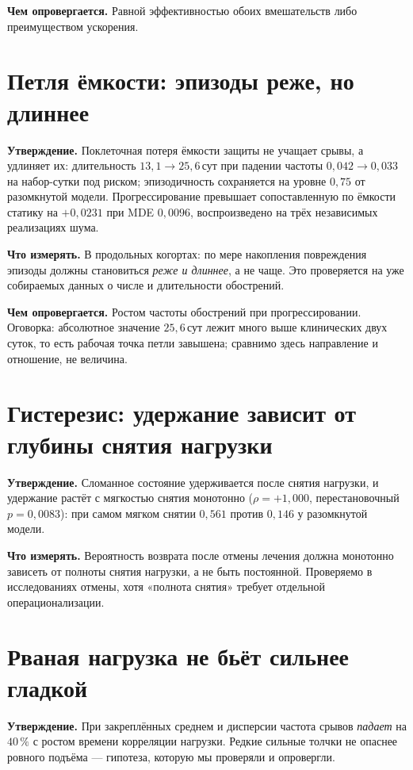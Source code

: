 \documentclass[11pt,a4paper]{article}
\begin{document}
\textbf{Чем опровергается.} Равной эффективностью обоих вмешательств либо преимуществом ускорения.

\section{Петля ёмкости: эпизоды реже, но длиннее}
\textbf{Утверждение.} Поклеточная потеря ёмкости защиты не учащает срывы, а удлиняет их:
длительность $13{,}1\to25{,}6$\,сут при падении частоты $0{,}042\to0{,}033$ на набор-сутки под
риском; эпизодичность сохраняется на уровне $0{,}75$ от разомкнутой модели. Прогрессирование
превышает сопоставленную по ёмкости статику на $+0{,}0231$ при MDE $0{,}0096$, воспроизведено на
трёх независимых реализациях шума.

\textbf{Что измерять.} В продольных когортах: по мере накопления повреждения эпизоды должны
становиться \emph{реже и длиннее}, а не чаще. Это проверяется на уже собираемых данных о числе и
длительности обострений.

\textbf{Чем опровергается.} Ростом частоты обострений при прогрессировании. Оговорка: абсолютное
значение $25{,}6$\,сут лежит много выше клинических двух суток, то есть рабочая точка петли
завышена; сравнимо здесь направление и отношение, не величина.

\section{Гистерезис: удержание зависит от глубины снятия нагрузки}
\textbf{Утверждение.} Сломанное состояние удерживается после снятия нагрузки, и удержание растёт
с мягкостью снятия монотонно ($\rho=+1{,}000$, перестановочный $p=0{,}0083$): при самом мягком
снятии $0{,}561$ против $0{,}146$ у разомкнутой модели.

\textbf{Что измерять.} Вероятность возврата после отмены лечения должна монотонно зависеть от
полноты снятия нагрузки, а не быть постоянной. Проверяемо в исследованиях отмены, хотя «полнота
снятия» требует отдельной операционализации.

\section{Рваная нагрузка не бьёт сильнее гладкой}
\textbf{Утверждение.} При закреплённых среднем и дисперсии частота срывов \emph{падает} на
$40\,\%$ с ростом времени корреляции нагрузки. Редкие сильные толчки не опаснее ровного подъёма ---
гипотеза, которую мы проверяли и опровергли.
\end{document}
